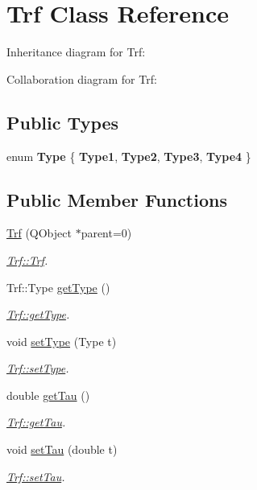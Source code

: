 \hypertarget{classTrf}{}\section{Trf Class Reference}
\label{classTrf}


Inheritance diagram for Trf\+:


Collaboration diagram for Trf\+:
\subsection*{Public Types}
\begin{DoxyCompactItemize}
\item 
\hypertarget{classTrf_a95d5a31d33597372b88527b4072246fb}{}enum {\bfseries Type} \{ {\bfseries Type1}, 
{\bfseries Type2}, 
{\bfseries Type3}, 
{\bfseries Type4}
 \}\label{classTrf_a95d5a31d33597372b88527b4072246fb}

\end{DoxyCompactItemize}
\subsection*{Public Member Functions}
\begin{DoxyCompactItemize}
\item 
\hyperlink{classTrf_a7e7c53f1e2e7f15e416bcffc6d259425}{Trf} (Q\+Object $\ast$parent=0)
\begin{DoxyCompactList}\small\item\em \hyperlink{classTrf_a7e7c53f1e2e7f15e416bcffc6d259425}{Trf\+::\+Trf}. \end{DoxyCompactList}\item 
Trf\+::\+Type \hyperlink{classTrf_a83cfd9d1f9feb5666f9222041d9d8c71}{get\+Type} ()
\begin{DoxyCompactList}\small\item\em \hyperlink{classTrf_a83cfd9d1f9feb5666f9222041d9d8c71}{Trf\+::get\+Type}. \end{DoxyCompactList}\item 
void \hyperlink{classTrf_a3fe2a559037af5cfaa9a07d1f34601c4}{set\+Type} (Type t)
\begin{DoxyCompactList}\small\item\em \hyperlink{classTrf_a3fe2a559037af5cfaa9a07d1f34601c4}{Trf\+::set\+Type}. \end{DoxyCompactList}\item 
double \hyperlink{classTrf_a6e366454617b79c90927624f025f222f}{get\+Tau} ()
\begin{DoxyCompactList}\small\item\em \hyperlink{classTrf_a6e366454617b79c90927624f025f222f}{Trf\+::get\+Tau}. \end{DoxyCompactList}\item 
void \hyperlink{classTrf_a4162a49bf984baaf406409ab3cd8f029}{set\+Tau} (double t)
\begin{DoxyCompactList}\small\item\em \hyperlink{classTrf_a4162a49bf984baaf406409ab3cd8f029}{Trf\+::set\+Tau}. \end{DoxyCompactList}\end{DoxyCompactItemize}


